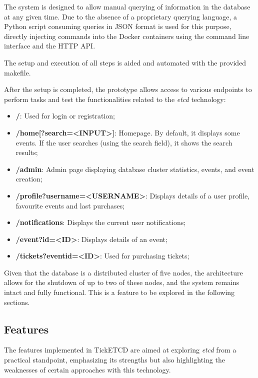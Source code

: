 \documentclass[screen,review]{acmart}
\begin{document}
The system is designed to allow manual querying of information in the database at any given time. Due to the absence of a proprietary querying language, a Python script consuming queries in JSON format is used for this purpose, directly injecting commands into the Docker containers using the command line interface and the HTTP API.

The setup and execution of all steps is aided and automated with the provided makefile.

After the setup is completed, the prototype allows access to various endpoints to perform tasks and test the functionalities related to the \textit{etcd} technology:

\begin{itemize}
    \item \textbf{/}: Used for login or registration;
    \item \textbf{/home[?search=<INPUT>]}: Homepage. By default, it displays some events. If the user searches (using the search field), it shows the search results;
    \item \textbf{/admin}: Admin page displaying database cluster statistics, events, and event creation;
    \item \textbf{/profile?username=<USERNAME>}: Displays details of a user profile, favourite events and last purchases;
    \item \textbf{/notifications}: Displays the current user notifications;
    \item \textbf{/event?id=<ID>}: Displays details of an event;
    \item \textbf{/tickets?eventid=<ID>}: Used for purchasing tickets;
\end{itemize}

Given that the database is a distributed cluster of five nodes, the architecture allows for the shutdown of up to two of these nodes, and the system remains intact and fully functional. This is a feature to be explored in the following sections.

\subsection{Features}

The features implemented in TickETCD are aimed at exploring \textit{etcd} from a practical standpoint, emphasizing its strengths but also highlighting the weaknesses of certain approaches with this technology. \\
\end{document}
